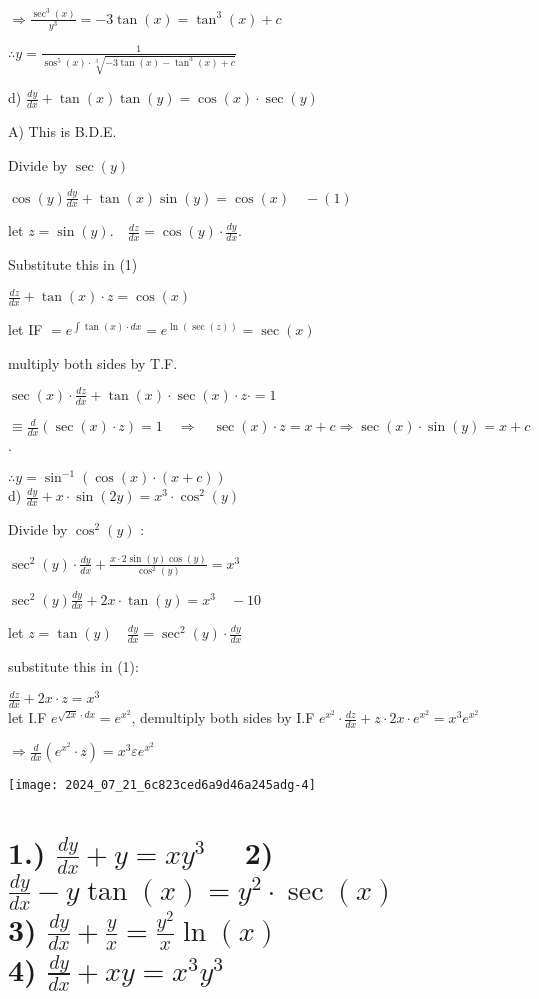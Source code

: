 \documentclass[12pt, a4paper]{article}
\begin{document}
$\Rightarrow \frac{\sec ^{3}(x)}{y^{3}}=-3 \tan(x)=\tan ^{3}(x)+c$

$\therefore y=\frac{1}{\operatorname{sos}^{5}(x) \cdot \sqrt[3]{-3 \tan(x)-\tan ^{3}(x)+c}}$

d) $\frac{d y}{d x}+\tan(x) \tan(y)=\cos(x) \cdot \sec (y)$

A) This is B.D.E.

Divide by $\sec (y)$

$\cos(y) \frac{d y}{d x}+\tan(x) \sin(y)=\cos(x) \quad-(1)$

let $z=\sin(y) . \quad \frac{d z}{d x}=\cos(y) \cdot \frac{d y}{d x}$.

Substitute this in (1)

$\frac{d z}{d x}+\tan(x) \cdot z=\cos(x)$

let IF $=e^{\int \tan(x) \cdot d x}=e^{\ln (\sec (z))}=\sec (x)$

multiply both sides by T.F.

$\sec (x) \cdot \frac{d z}{d x}+\tan(x) \cdot \sec (x) \cdot z \cdot=1$

$\equiv \frac{d}{d x}(\sec (x) \cdot z)=1 \quad \Rightarrow \quad \sec (x) \cdot z=x+c \Rightarrow \sec (x) \cdot \sin(y)=x+c$.

$\therefore y=\sin ^{-1}(\cos(x) \cdot(x+c))$\\
d) $\frac{d y}{d x}+x \cdot \sin(2 y)=x^{3} \cdot \cos ^{2}(y)$

Divide by $\cos ^{2}(y)$ :

$\sec ^{2}(y) \cdot \frac{d y}{d x}+\frac{x \cdot 2 \sin(y) \cos(y)}{\cos ^{2}(y)}=x^{3}$

$\sec ^{2}(y) \frac{d y}{d x}+2 x \cdot \tan(y)=x^{3} \quad-10$

let $z=\tan(y) \quad \frac{d y}{d x}=\sec ^{2}(y) \cdot \frac{d y}{d x}$

substitute this in (1):

$\frac{d z}{d x}+2 x \cdot z=x^{3}$\\
let I.F $e^{\sqrt{2 x} \cdot d x}=e^{x^2 }$, demultiply both sides by I.F $e^{x^2 } \cdot \frac{d z}{d x}+z \cdot 2 x \cdot e^{x^2 }=x^{3} e^{x^2 }$

$\Rightarrow \frac{d}{d x}\left(e^{x^2 } \cdot z\right)=x^{3} \varepsilon e^{x^2 }$

\begin{center}
	\texttt{[image: 2024\_07\_21\_6c823ced6a9d46a245adg-4]}
\end{center}

\section*{1.) $\frac{d y}{d x}+y=x y^{3} \quad$ 2) $\frac{d y}{d x}-y \tan(x)=y^2 \cdot \sec (x)$ \\
3) $\frac{d y}{d x}+\frac{y}{x}=\frac{y^2}{x} \ln (x)$ \\
4) $\frac{d y}{d x}+x y=x^{3} y^{3}$}
\end{document}
